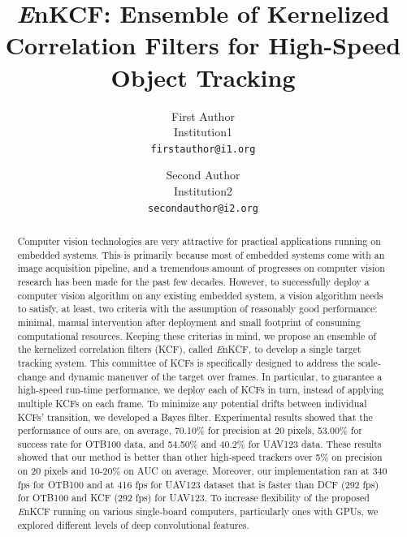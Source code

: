 \documentclass[10pt,twocolumn,letterpaper]{article}
\begin{document}
\title{{\it E}nKCF: Ensemble of Kernelized Correlation Filters for
  High-Speed Object Tracking}

\author{First Author \\
Institution1\\
{\tt\small firstauthor@i1.org}
\and
Second Author \\
Institution2\\
{\tt\small secondauthor@i2.org}
}

\maketitle
\ifwacvfinal\thispagestyle{empty}\fi

\begin{abstract}
Computer vision technologies are very attractive for practical
applications running on embedded systems. This is primarily because
most of embedded systems come with an image acquisition pipeline, and
a tremendous amount of progresses on computer vision research has been
made for the past few decades. However, to successfully deploy a
computer vision algorithm on any existing embedded system, a vision
algorithm needs to satisfy, at least, two criteria with the assumption
of reasonably good performance: minimal, manual intervention after
deployment and small footprint of consuming computational
resources. Keeping these criterias in mind, we propose an ensemble of the 
kernelized correlation filters (KCF), called {\it E}nKCF, to develop a single target
tracking system. This committee of KCFs is
specifically designed to address the scale-change and dynamic maneuver
of the target over frames. In particular, to guarantee a high-speed
run-time performance, we deploy each of KCFs in turn, instead of
applying multiple KCFs on each frame. To minimize any potential drifts
between individual KCFs' transition, we developed a Bayes
filter. Experimental results showed that the performance of ours are,
on average, 70.10\% for precision at 20 pixels, 53.00\% for success
rate for OTB100 data, and 54.50\% and 40.2\% for UAV123 data. These
results showed that our method is better than other high-speed trackers over 5\%
on precision on 20 pixels and 10-20\% on AUC on average. Moreover, our
implementation ran at 340 fps for OTB100 and at 416 fps for UAV123
dataset that is faster than DCF (292 fps) for OTB100 and KCF (292 fps) 
for UAV123. To increase flexibility of the proposed {\it E}nKCF running on 
various single-board computers, particularly ones
with GPUs, we explored different levels of deep convolutional features.
\end{abstract}
\end{document}
